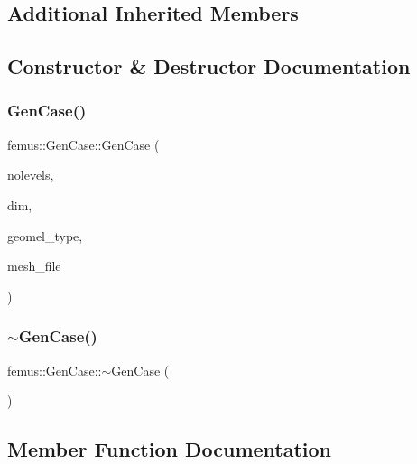 \subsection*{Additional Inherited Members}


\subsection{Constructor \& Destructor Documentation}
\mbox{\label{classfemus_1_1_gen_case_aac5da7e30562ce9e894192215c2db96c}} 
\subsubsection{\texorpdfstring{Gen\+Case()}{GenCase()}}
{\footnotesize\ttfamily femus\+::\+Gen\+Case\+::\+Gen\+Case (\begin{DoxyParamCaption}\item[{const unsigned}]{nolevels,  }\item[{const unsigned}]{dim,  }\item[{const \mbox{\hyperlink{_geom_el_type_enum_8hpp_a5f4d1ffd8f6d0e4930c05074e733031d}{Geom\+El\+Type}}}]{geomel\+\_\+type,  }\item[{const std\+::string}]{mesh\+\_\+file }\end{DoxyParamCaption})}

\mbox{\label{classfemus_1_1_gen_case_ae154b7b406541bda5fc562ac7350574f}} 
\subsubsection{\texorpdfstring{$\sim$\+Gen\+Case()}{~GenCase()}}
{\footnotesize\ttfamily femus\+::\+Gen\+Case\+::$\sim$\+Gen\+Case (\begin{DoxyParamCaption}{ }\end{DoxyParamCaption})}



\subsection{Member Function Documentation}
\mbox{\label{classfemus_1_1_gen_case_af03fdb695fdbdd9328ab53c28e57b796}} 
